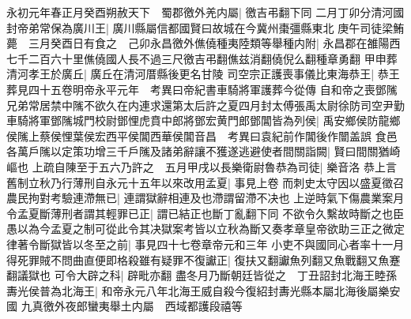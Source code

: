 永初元年春正月癸酉朔赦天下　蜀郡徼外羌内屬|{
	徼吉弔翻下同}
二月丁卯分清河國封帝弟常保為廣川王|{
	廣川縣屬信都國賢曰故城在今冀州棗彊縣東北}
庚午司徒梁鮪薨　三月癸酉日有食之　己卯永昌徼外僬僥種夷陸類等舉種内附|{
	永昌郡在雒陽西七千二百六十里僬僥國人長不過三尺徼吉弔翻僬兹消翻僥倪么翻種章勇翻}
甲申葬清河孝王於廣丘|{
	廣丘在清河厝縣後更名甘陵}
司空宗正護喪事儀比東海恭王|{
	恭王葬見四十五卷明帝永平元年　考異曰帝紀書車騎將軍護葬今從傳}
自和帝之喪鄧隲兄弟常居禁中隲不欲久在内連求還第太后許之夏四月封太傅張禹太尉徐防司空尹勤車騎將軍鄧隲城門校尉鄧悝虎賁中郎將鄧宏黄門郎鄧閶皆為列侯|{
	禹安鄉侯防龍鄉侯隲上蔡侯悝葉侯宏西平侯閶西華侯閶音昌　考異曰袁紀前作閶後作闓盖誤}
食邑各萬戶隲以定策功增三千戶隲及諸弟辭讓不獲遂逃避使者間關詣闕|{
	賢曰間關猶崎嶇也}
上疏自陳至于五六乃許之　五月甲戌以長樂衛尉魯恭為司徒|{
	樂音洛}
恭上言舊制立秋乃行薄刑自永元十五年以來改用孟夏|{
	事見上卷}
而刺史太守因以盛夏徵召農民拘對考驗連滯無已|{
	連謂獄辭相連及也滯謂留滯不决也}
上逆時氣下傷農業案月令孟夏斷薄刑者謂其輕罪已正|{
	謂已結正也斷丁亂翻下同}
不欲令久繫故時斷之也臣愚以為今孟夏之制可從此令其决獄案考皆以立秋為斷又奏孝章皇帝欲助三正之微定律著令斷獄皆以冬至之前|{
	事見四十七卷章帝元和三年}
小吏不與國同心者率十一月得死罪賊不問曲直便即格殺雖有疑罪不復讞正|{
	復扶又翻讞魚列翻又魚戰翻又魚蹇翻議獄也}
可令大辟之科|{
	辟毗亦翻}
盡冬月乃斷朝廷皆從之　丁丑詔封北海王睦孫夀光侯普為北海王|{
	和帝永元八年北海王威自殺今復紹封夀光縣本屬北海後屬樂安國}
九真徼外夜郎蠻夷舉土内屬　西域都護段禧等

